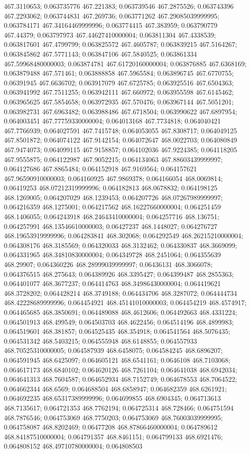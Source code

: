 467.3110653; 0.063735776 467.221383; 0.063739546 467.2875526; 0.063743396 467.2293062; 0.063744831 467.269736; 0.063771262 467.29085039999995; 0.063784171 467.34164469999996; 0.063774415 467.383959; 0.063790779 467.44379; 0.063797973 467.44627410000004; 0.063811304 467.4338539; 0.063817601 467.4799799; 0.063825572 467.4605787; 0.063839215 467.5164267; 0.063845862 467.5771143; 0.063847106 467.5840525; 0.063861334 467.59968480000003; 0.063874781 467.61720160000004; 0.063876885 467.6368169; 0.063879488 467.571461; 0.063888858 467.5965584; 0.063896745 467.6770755; 0.06391945 467.6636702; 0.063917079 467.6725785; 0.063925516 467.6504363; 0.063941992 467.7511255; 0.063942111 467.660972; 0.063955598 467.6145462; 0.063965625 467.5854658; 0.063972935 467.570476; 0.063967144 467.5051201; 0.063982731 467.6963482; 0.063988486 467.6718504; 0.063990622 467.6897954; 0.064003451 467.77759330000004; 0.064013168 467.7734818; 0.064040421 467.7766939; 0.064027591 467.7415748; 0.064053055 467.8308717; 0.064049125 467.8501872; 0.064074122 467.9142154; 0.064072647 468.0022703; 0.064080849 467.9474073; 0.064099115 467.9158857; 0.064102036 467.9224385; 0.064118205 467.9555875; 0.064122987 467.9052215; 0.064134063 467.88603439999997; 0.064127686 467.8865484; 0.064152918 467.9169564; 0.064157621 467.96590910000003; 0.064160925 467.9869378; 0.064166054 468.0069814; 0.06419253 468.07212319999996; 0.064182813 468.0678832; 0.064198125 468.1269005; 0.064207029 468.1239453; 0.064207726 468.07267989999997; 0.064216359 468.1275001; 0.064217562 468.16227660000004; 0.064251459 468.1406055; 0.064243918 468.24643410000004; 0.064257716 468.136751; 0.064257991 468.13546610000003; 0.06427237 468.1448027; 0.064276727 468.19653919999996; 0.064283841 468.302068; 0.064292549 468.26215210000004; 0.064308176 468.3185569; 0.064320033 468.3132462; 0.064330837 468.3669099; 0.064331965 468.34810830000004; 0.064349728 468.2451064; 0.064355639 468.29907; 0.064360226 468.28999039999997; 0.06436131 468.3066078; 0.064376515 468.275643; 0.064389926 468.3395427; 0.064399487 468.2855363; 0.064401077 468.3677237; 0.064414763 468.34986430000004; 0.064419621 468.3728202; 0.064428214 468.3749188; 0.064434706 468.3287072; 0.064444734 468.42228689999996; 0.064454921 468.45141010000003; 0.064454219 468.4574917; 0.064465685 468.3850691; 0.064489088 468.4612606; 0.064492663 468.4331224; 0.064501913 468.499549; 0.064503703 468.4622456; 0.064514196 468.4899983; 0.064519601 468.381857; 0.064525435 468.354918; 0.064541564 468.5076435; 0.064531342 468.5403215; 0.064555948 468.6148855; 0.064557933 468.70525310000005; 0.064587939 468.6458075; 0.064584245 468.6896207; 0.064591945 468.6425097; 0.064605121 468.6541161; 0.0646108 468.7103068; 0.064617173 468.6840102; 0.064620126 468.7261104; 0.064641038 468.6942034; 0.064641313 468.7604587; 0.064652934 468.7152749; 0.064678553 468.7064522; 0.064662344 468.6569; 0.064688504 468.6858947; 0.064682359 468.6261921; 0.064692235 468.65317389999996; 0.064699855 468.6904345; 0.064713613 468.7135617; 0.064721353 468.7762194; 0.064725314 468.728466; 0.064751594 468.7876546; 0.064753069 468.7750203; 0.064753069 468.76003039999995; 0.064758087 468.8202469; 0.06477208 468.87866460000004; 0.064789612 468.84187510000004; 0.064791357 468.8461151; 0.064799133 468.6921476; 0.064808152 468.49710780000004; 0.064808503 